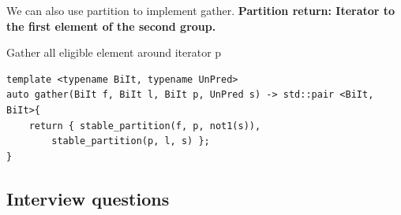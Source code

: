\documentclass[a4paper,11pt,twoside]{book}
\begin{document}
	\par  We can also use partition to implement gather. \textbf{Partition return: Iterator to the first element of the second group.}

	\par  Gather all eligible element around iterator p
\begin{lstlisting}[numbers=none]
template <typename BiIt, typename UnPred> 
auto gather(BiIt f, BiIt l, BiIt p, UnPred s) -> std::pair <BiIt, BiIt>{
	return { stable_partition(f, p, not1(s)), 
		stable_partition(p, l, s) };
}		
\end{lstlisting}





\subsection{Interview questions}
\end{document}
